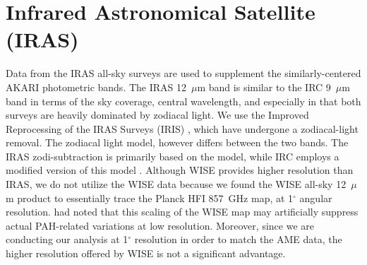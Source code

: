     \section{Infrared Astronomical Satellite (IRAS)}
       Data from the IRAS \citep{iras84} all-sky surveys are used to supplement the similarly-centered AKARI photometric bands. The IRAS 12~$\mu$m band is similar to the IRC 9~$\mu$m band in terms of the sky coverage, central wavelength, and especially in that both surveys are heavily dominated by zodiacal light. We use the Improved Reprocessing of the IRAS Surveys (IRIS) \citep{iris05}, which have undergone a zodiacal-light removal. The zodiacal light model, however differs between the two bands. The IRAS zodi-subtraction is primarily based on the \cite{kelsall98} model, while IRC employs a modified version of this model \citep{kondo16}. Although WISE provides higher resolution than IRAS, we do not utilize the WISE data because we found the WISE all-sky 12~$\mu$m product to essentially trace the Planck HFI 857~GHz map, at 1$^{\circ}$ angular resolution. \cite{hensley16} had noted that this scaling of the WISE map may artificially suppress actual PAH-related variations at low resolution. Moreover, since we are conducting our analysis at 1$^{\circ}$ resolution in order to match the AME data, the higher resolution offered by WISE is not a significant advantage.

